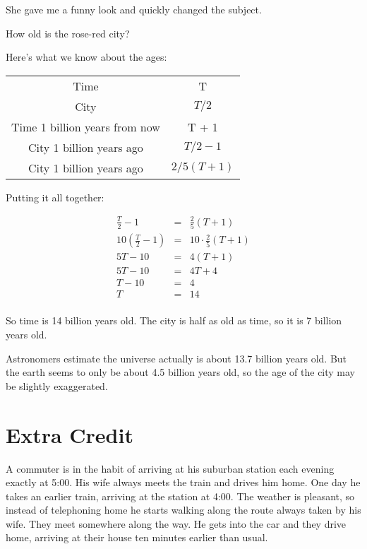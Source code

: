 \documentclass{exam}
\begin{document}
\begin{questions}
She gave me a funny look and quickly changed the subject.

How old is the rose-red city?

\begin{solution}

Here's what we know about the ages:

\begin{tabular}{|c|c|}
\hline
  Time & T \\
  City & \( T/2 \) \\
  Time 1 billion years from now  & T + 1 \\
  City 1 billion years ago & \( T/2 - 1\) \\
  City 1 billion years ago & \(2/5 (T + 1) \) \\
\hline
\end{tabular}

\vspace{.2 cm}

Putting it all together:

\begin{eqnarray*}
  \frac{T}{2} - 1 & = & \frac{2}{5} (T + 1) \\
  10 \left( \frac{T}{2} - 1 \right) & = & 10 \cdot \frac{2}{5} (T + 1)  \\
  5T - 10 & = & 4(T + 1) \\
  5T - 10 & = & 4T + 4 \\
  T - 10 & = & 4 \\
  T & = & 14 \\
\end{eqnarray*}

So time is 14 billion years old.  The city is half as old as time, so it is 7 billion years old.

Astronomers estimate the universe actually is about 13.7 billion years old.  But the earth seems to only be about 4.5 billion years
old, so the age of the city may be slightly exaggerated.

\end{solution}

\section{Extra Credit}

\question

A commuter is in the habit of arriving at his suburban station each evening exactly at 5:00.  His wife always meets the
train and drives him home.  One day he takes an earlier train, arriving at the station at 4:00.  The weather is
pleasant, so instead of telephoning home he starts walking along the route always taken by his wife.  They meet
somewhere along the way.  He gets into the car and they drive home, arriving at their house ten minutes earlier than
usual.  


\end{questions}
\end{document}
